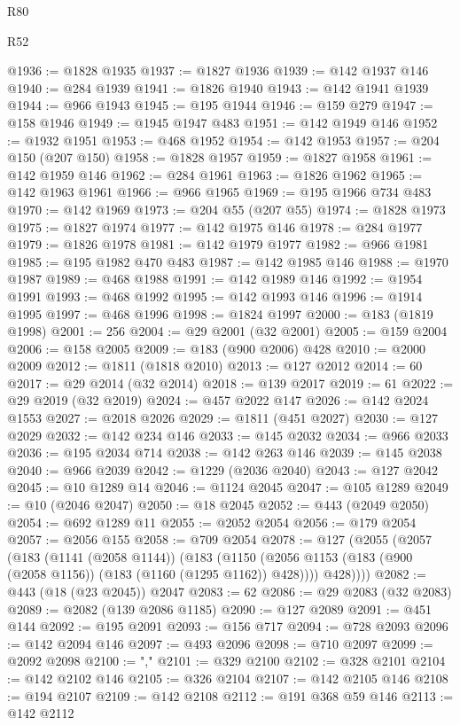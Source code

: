 \begin{lexlean}{R80}
\begin{lexlean}{R52}
\begin{coremodule}
{{{{{{{{{{{{{{{{{{{{{{{{{{{{{{{{{{{{{{{{{{{{{{{{{{{{{{{{{{{{{{{{{{{{{{{{{{{{{{{{{{{{{{{{{{{{{{{{{{{{{{{{{{{{{{{{{{{{{{{{{{{{{{{{{{{{{{{{{{{{{{{{{{{{{{{{{{{{{{{{{{{{{{{{{{{{{{{{{{{{{{{{{{{{{{{{{{{{{{@1936 := @1828 @1935
@1937 := @1827 @1936
@1939 := @142 @1937 @146
@1940 := @284 @1939
@1941 := @1826 @1940
@1943 := @142 @1941 @1939
@1944 := @966 @1943
@1945 := @195 @1944
@1946 := @159 @279
@1947 := @158 @1946
@1949 := @1945 @1947 @483
@1951 := @142 @1949 @146
@1952 := @1932 @1951
@1953 := @468 @1952
@1954 := @142 @1953
@1957 := @204 @150 (@207 @150)
@1958 := @1828 @1957
@1959 := @1827 @1958
@1961 := @142 @1959 @146
@1962 := @284 @1961
@1963 := @1826 @1962
@1965 := @142 @1963 @1961
@1966 := @966 @1965
@1969 := @195 @1966 @734 @483
@1970 := @142 @1969
@1973 := @204 @55 (@207 @55)
@1974 := @1828 @1973
@1975 := @1827 @1974
@1977 := @142 @1975 @146
@1978 := @284 @1977
@1979 := @1826 @1978
@1981 := @142 @1979 @1977
@1982 := @966 @1981
@1985 := @195 @1982 @470 @483
@1987 := @142 @1985 @146
@1988 := @1970 @1987
@1989 := @468 @1988
@1991 := @142 @1989 @146
@1992 := @1954 @1991
@1993 := @468 @1992
@1995 := @142 @1993 @146
@1996 := @1914 @1995
@1997 := @468 @1996
@1998 := @1824 @1997
@2000 := @183 (@1819 @1998)
@2001 := 256
@2004 := @29 @2001 (@32 @2001)
@2005 := @159 @2004
@2006 := @158 @2005
@2009 := @183 (@900 @2006) @428
@2010 := @2000 @2009
@2012 := @1811 (@1818 @2010)
@2013 := @127 @2012
@2014 := 60
@2017 := @29 @2014 (@32 @2014)
@2018 := @139 @2017
@2019 := 61
@2022 := @29 @2019 (@32 @2019)
@2024 := @457 @2022 @147
@2026 := @142 @2024 @1553
@2027 := @2018 @2026
@2029 := @1811 (@451 @2027)
@2030 := @127 @2029
@2032 := @142 @234 @146
@2033 := @145 @2032
@2034 := @966 @2033
@2036 := @195 @2034 @714
@2038 := @142 @263 @146
@2039 := @145 @2038
@2040 := @966 @2039
@2042 := @1229 (@2036 @2040)
@2043 := @127 @2042
@2045 := @10 @1289 @14
@2046 := @1124 @2045
@2047 := @105 @1289
@2049 := @10 (@2046 @2047)
@2050 := @18 @2045
@2052 := @443 (@2049 @2050)
@2054 := @692 @1289 @11
@2055 := @2052 @2054
@2056 := @179 @2054
@2057 := @2056 @155
@2058 := @709 @2054
@2078 := @127
    (@2055
      (@2057
        (@183
          (@1141 (@2058 @1144))
          (@183
            (@1150 (@2056 @1153 (@183 (@900 (@2058 @1156)) (@183 (@1160 (@1295 @1162)) @428))))
            @428))))
@2082 := @443 (@18 (@23 @2045)) @2047
@2083 := 62
@2086 := @29 @2083 (@32 @2083)
@2089 := @2082 (@139 @2086 @1185)
@2090 := @127 @2089
@2091 := @451 @144
@2092 := @195 @2091
@2093 := @156 @717
@2094 := @728 @2093
@2096 := @142 @2094 @146
@2097 := @493 @2096
@2098 := @710 @2097
@2099 := @2092 @2098
@2100 := ","
@2101 := @329 @2100
@2102 := @328 @2101
@2104 := @142 @2102 @146
@2105 := @326 @2104
@2107 := @142 @2105 @146
@2108 := @194 @2107
@2109 := @142 @2108
@2112 := @191 @368 @59 @146
@2113 := @142 @2112
}}}}}}}}}}}}}}}}}}}}}}}}}}}}}}}}}}}}}}}}}}}}}}}}}}}}}}}}}}}}}}}}}}}}}}}}}}}}}}}}}}}}}}}}}}}}}}}}}}}}}}}}}}}}}}}}}}}}}}}}}}}}}}}}}}}}}}}}}}}}}}}}}}}}}}}}}}}}}}}}}}}}}}}}}}}}}}}}}}}}}}}}}}}}}}}}}}}}}}
\end{coremodule}
\end{lexlean}
\end{lexlean}
